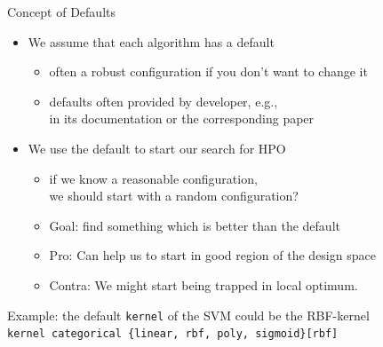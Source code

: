 \begin{frame}[c]{Concept of Defaults}

\begin{itemize}
  \item We assume that each algorithm has a default
  \begin{itemize}
    \item often a robust configuration if you don't want to change it
    \item defaults often provided by developer, e.g.,\\
   		  in its documentation or the corresponding paper
  \end{itemize}
  \pause
  \item We use the default to start our search for HPO
  \begin{itemize}
    \item if we know a reasonable configuration,\\ we should start with a random configuration?
    \item Goal: find something which is better than the default
    \pause
    \smallskip
    \item Pro: Can help us to start in good region of the design space
    \item Contra: We might start being trapped in local optimum.
  \end{itemize}
\end{itemize}

\pause
Example: the default \texttt{kernel} of the SVM could be the RBF-kernel\\
\texttt{kernel categorical \{linear, rbf, poly, sigmoid\}[rbf]}

\end{frame}

